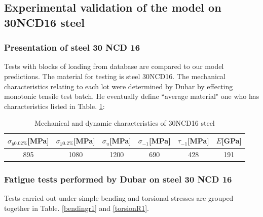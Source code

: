 \documentclass[3p,times,number,review]{elsarticle}
\begin{document}
\clearpage
\subsection{Experimental validation of the model on 30NCD16 steel}
\subsubsection{Presentation of steel 30 NCD 16}
Tests with blocks of loading from database are compared to our model predictions. The material for testing is steel 30NCD16. The mechanical characteristics relating to each lot were determined by Dubar \cite{Dubar1992} by effecting
monotonic tensile test batch. He eventually define ``average material" one who has
characteristics listed in Table. \ref{30ncdchar}:

\begin{table}[!h]
	\centering
	\begin{tabular}{|c|c|c|c|l|c|}
		\hline
		\textbf{$\sigma_{y0.02\%}${[}MPa{]}} & \textbf{$\sigma_{y0.2\%}${[}MPa{]}} & \textbf{$\sigma_u${[}MPa{]}} & \textbf{$\sigma_{-1}${[}MPa{]}} & \textbf{$\tau_{-1}${[}MPa{]}} & \textbf{$E${[}GPa{]}}\\ \hline
		895                                  & 1080                                & 1200                         & 690                             & \multicolumn{1}{c|}{428}     & 191 \\ \hline
	\end{tabular}
	\caption{Mechanical and dynamic characteristics of 30NCD16 steel \cite{Dubar1992}}
	\label{30ncdchar}
\end{table}

\subsubsection{Fatigue tests performed by Dubar on steel 30 NCD 16}
Tests carried out under simple bending and torsional stresses are grouped together in
Table. \ref{bendingr1} and \ref{torsionR1}.
\end{document}
